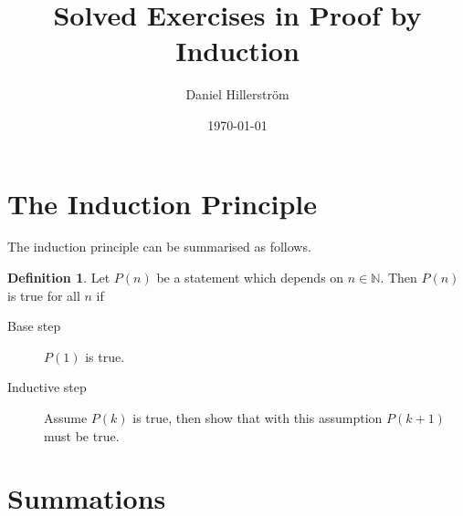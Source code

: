 \documentclass[a4paper,11pt]{article}
\author{Daniel Hillerström}
\date{\today}
\title{Solved Exercises in Proof by Induction}
\theoremstyle{plain}
\theoremstyle{definition}
\newtheorem{definition}[theorem]{Definition}
\begin{document}
\maketitle
\section{The Induction Principle}
The induction principle can be summarised as follows.
\begin{definition}
  Let $P(n)$ be a statement which depends on $n \in \mathbb{N}$. Then
  $P(n)$ is true for all $n$ if
  \begin{description}
    \item[Base step] $P(1)$ is true.
    \item[Inductive step] Assume $P(k)$ is true, then show that with
      this assumption $P(k + 1)$ must be true.
  \end{description}
\end{definition}

\section{Summations}
\end{document}
